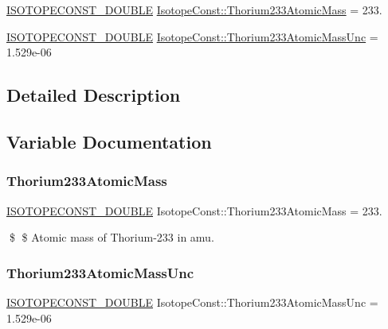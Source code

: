 \begin{DoxyCompactItemize}
\item 
\mbox{\hyperlink{group___isotope_const-_macros_ga8f45a7272ce02c0b4c65c44636ed719a}{I\+S\+O\+T\+O\+P\+E\+C\+O\+N\+S\+T\+\_\+\+D\+O\+U\+B\+LE}} \mbox{\hyperlink{group___isotope_const-_thorium-_th233_ga3991c4238cab8b4e513cfa7d77f4d109}{Isotope\+Const\+::\+Thorium233\+Atomic\+Mass}} = 233.
\item 
\mbox{\hyperlink{group___isotope_const-_macros_ga8f45a7272ce02c0b4c65c44636ed719a}{I\+S\+O\+T\+O\+P\+E\+C\+O\+N\+S\+T\+\_\+\+D\+O\+U\+B\+LE}} \mbox{\hyperlink{group___isotope_const-_thorium-_th233_ga5a0229a455c8975cdb6ec110a2385cef}{Isotope\+Const\+::\+Thorium233\+Atomic\+Mass\+Unc}} = 1.\+529e-\/06
\end{DoxyCompactItemize}


\subsection{Detailed Description}


\subsection{Variable Documentation}
\mbox{\label{group___isotope_const-_thorium-_th233_ga3991c4238cab8b4e513cfa7d77f4d109}} 
\subsubsection{\texorpdfstring{Thorium233\+Atomic\+Mass}{Thorium233AtomicMass}}
{\footnotesize\ttfamily \mbox{\hyperlink{group___isotope_const-_macros_ga8f45a7272ce02c0b4c65c44636ed719a}{I\+S\+O\+T\+O\+P\+E\+C\+O\+N\+S\+T\+\_\+\+D\+O\+U\+B\+LE}} Isotope\+Const\+::\+Thorium233\+Atomic\+Mass = 233.}

\$ \$ Atomic mass of Thorium-\/233 in amu. \mbox{\label{group___isotope_const-_thorium-_th233_ga5a0229a455c8975cdb6ec110a2385cef}} 
\subsubsection{\texorpdfstring{Thorium233\+Atomic\+Mass\+Unc}{Thorium233AtomicMassUnc}}
{\footnotesize\ttfamily \mbox{\hyperlink{group___isotope_const-_macros_ga8f45a7272ce02c0b4c65c44636ed719a}{I\+S\+O\+T\+O\+P\+E\+C\+O\+N\+S\+T\+\_\+\+D\+O\+U\+B\+LE}} Isotope\+Const\+::\+Thorium233\+Atomic\+Mass\+Unc = 1.\+529e-\/06}

